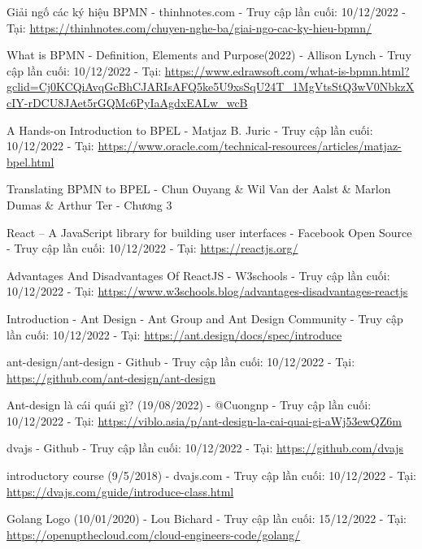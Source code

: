 
\begin{thebibliography}{9}
    Giải ngố các ký hiệu BPMN - thinhnotes.com - Truy cập lần cuối: 10/12/2022 - Tại: \url{https://thinhnotes.com/chuyen-nghe-ba/giai-ngo-cac-ky-hieu-bpmn/}

    What is BPMN - Definition, Elements and Purpose(2022) - Allison Lynch - Truy cập lần cuối: 10/12/2022 - Tại: \url{https://www.edrawsoft.com/what-is-bpmn.html?gclid=Cj0KCQiAvqGcBhCJARIsAFQ5ke5U9xsSqU24T_1MgVtsStQ3wV0NbkzXcIY-rDCU8JAet5rGQMc6PyIaAgdxEALw_wcB}

    A Hands-on Introduction to BPEL - Matjaz B. Juric - Truy cập lần cuối: 10/12/2022 - Tại: \url{https://www.oracle.com/technical-resources/articles/matjaz-bpel.html}

    Translating BPMN to BPEL - Chun Ouyang \& Wil Van der Aalst \& Marlon Dumas \& Arthur Ter - Chương 3

    React – A JavaScript library for building user interfaces - Facebook Open Source - Truy cập lần cuối: 10/12/2022 - Tại: \url{https://reactjs.org/}

    Advantages And Disadvantages Of ReactJS - W3schools - Truy cập lần cuối: 10/12/2022 - Tại: \url{https://www.w3schools.blog/advantages-disadvantages-reactjs}

    Introduction - Ant Design - Ant Group and Ant Design Community - Truy cập lần cuối: 10/12/2022 - Tại: \url{https://ant.design/docs/spec/introduce}

    ant-design/ant-design - Github - Truy cập lần cuối: 10/12/2022 - Tại: \url{https://github.com/ant-design/ant-design}

    Ant-design là cái quái gì? (19/08/2022) - @Cuongnp - Truy cập lần cuối: 10/12/2022 - Tại: \url{https://viblo.asia/p/ant-design-la-cai-quai-gi-aWj53ewQZ6m}

    dvajs - Github - Truy cập lần cuối: 10/12/2022 - Tại: \url{https://github.com/dvajs}

    introductory course (9/5/2018) - dvajs.com - Truy cập lần cuối: 10/12/2022 - Tại: \url{https://dvajs.com/guide/introduce-class.html}

    Golang Logo (10/01/2020) - Lou Bichard - Truy cập lần cuối: 15/12/2022 - Tại: \url{https://openupthecloud.com/cloud-engineers-code/golang/}


\end{thebibliography}
